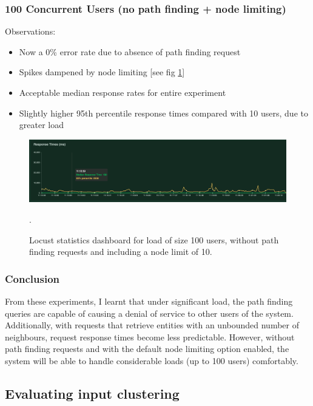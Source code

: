 \subsubsection{100 Concurrent Users (no path finding + node limiting)}
Observations:
\begin{itemize}
    \item Now a 0\% error rate due to absence of path finding request
    \item Spikes dampened by node limiting [see fig \ref{fig:100-users-no-path-with-limit}]
    \item Acceptable median response rates for entire experiment
    \item Slightly higher 95th percentile response times compared with 10 users, due to greater load
\end{itemize}

\begin{figure}[h!]
  \centering
  \includegraphics[width = 15cm]{./figures/100-users-no-path-node-limit}\\[0.5cm]
  \caption{Locust statistics dashboard for load of size 100 users, without path finding requests and including a node limit of 10.}.
  \label{fig:100-users-no-path-with-limit}
\end{figure}

\subsubsection{Conclusion}
From these experiments, I learnt that under significant load, the path finding queries are capable of causing a denial of service to other users of the system. Additionally, with requests that retrieve entities with an unbounded number of neighbours, request response times become less predictable. However, without path finding requests and with the default node limiting option enabled, the system will be able to handle considerable loads (up to 100 users) comfortably. 

\subsection{Evaluating input clustering}
